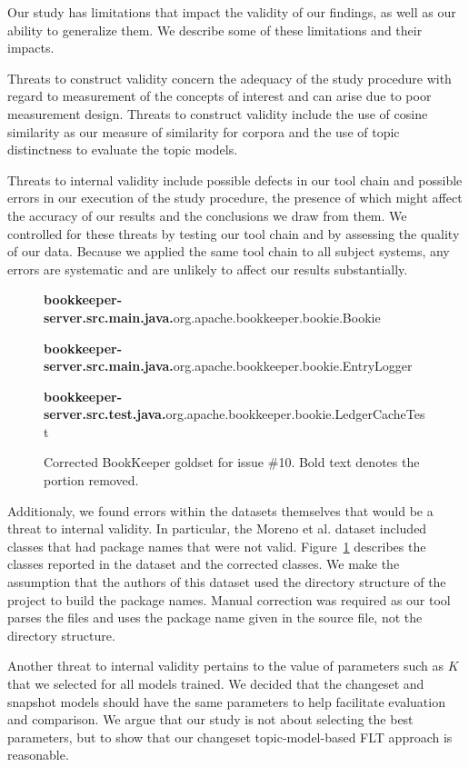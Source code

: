 
Our study has limitations that impact the validity of our findings,
as well as our ability to generalize them.
We describe some of these limitations and their impacts.

Threats to construct validity concern the adequacy of the study procedure with regard to
measurement of the concepts of interest and can arise due to poor measurement design.
Threats to construct validity include the use of cosine similarity as our measure of similarity for corpora
and the use of topic distinctness to evaluate the topic models.

Threats to internal validity include possible defects in our tool chain and possible errors
in our execution of the study procedure,
the presence of which might affect the accuracy of our results and the conclusions we draw from them.
We controlled for these threats by testing our tool chain and by assessing the quality of our data.
Because we applied the same tool chain to all subject systems, any errors are systematic and are unlikely
to affect our results substantially.


\begin{figure}[t]
\footnotesize

{\bf bookkeeper-server.src.main.java.}org.apache.bookkeeper.bookie.Bookie

{\bf bookkeeper-server.src.main.java.}org.apache.bookkeeper.bookie.EntryLogger

{\bf bookkeeper-server.src.test.java.}org.apache.bookkeeper.bookie.LedgerCacheTest

\caption{Corrected BookKeeper goldset for issue \#10. Bold text denotes the portion removed.}
\label{fig:goldsetfix}
\vspace{-10pt}
\end{figure}


Additionaly, we found errors within the datasets themselves that would be a threat to internal validity.
In particular, the Moreno et al. dataset included classes that had package names that were not valid.
Figure~\ref{fig:goldsetfix} describes the classes reported in the dataset
and the corrected classes.
We make the assumption that the authors of this dataset used the directory structure of the project to build the package names.
Manual correction was required as our tool parses the files and uses the package name given in the source file, not the directory structure.

Another threat to internal validity pertains to the value of parameters such as $K$ that we selected for all models trained.
We decided that the changeset and snapshot models should have the same parameters to help facilitate evaluation and comparison.
We argue that our study is not about selecting the best parameters,
but to show that our changeset topic-model-based FLT approach is reasonable.


